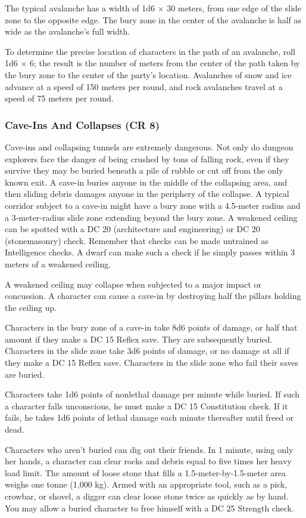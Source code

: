The typical avalanche has a width of 1d6 $\times$ 30 meters, from one edge of the slide zone to the opposite edge. The bury zone in the center of the avalanche is half as wide as the avalanche's full width.

To determine the precise location of characters in the path of an avalanche, roll 1d6 $\times$ 6; the result is the number of meters from the center of the path taken by the bury zone to the center of the party's location. Avalanches of snow and ice advance at a speed of 150 meters per round, and rock avalanches travel at a speed of 75 meters per round.

\subsubsection{Cave-Ins And Collapses (CR 8)}
Cave-ins and collapsing tunnels are extremely dangerous. Not only do dungeon explorers face the danger of being crushed by tons of falling rock, even if they survive they may be buried beneath a pile of rubble or cut off from the only known exit. A cave-in buries anyone in the middle of the collapsing area, and then sliding debris damages anyone in the periphery of the collapse. A typical corridor subject to a cave-in might have a bury zone with a 4.5-meter radius and a 3-meter-radius slide zone extending beyond the bury zone. A weakened ceiling can be spotted with a DC 20  (architecture and engineering) or DC 20  (stonemasonry) check. Remember that  checks can be made untrained as Intelligence checks. A dwarf can make such a check if he simply passes within 3 meters of a weakened ceiling.

A weakened ceiling may collapse when subjected to a major impact or concussion. A character can cause a cave-in by destroying half the pillars holding the ceiling up.

Characters in the bury zone of a cave-in take 8d6 points of damage, or half that amount if they make a DC 15 Reflex save. They are subsequently buried. Characters in the slide zone take 3d6 points of damage, or no damage at all if they make a DC 15 Reflex save. Characters in the slide zone who fail their saves are buried.

Characters take 1d6 points of nonlethal damage per minute while buried. If such a character falls unconscious, he must make a DC 15 Constitution check. If it fails, he takes 1d6 points of lethal damage each minute thereafter until freed or dead.

Characters who aren't buried can dig out their friends. In 1 minute, using only her hands, a character can clear rocks and debris equal to five times her heavy load limit. The amount of loose stone that fills a 1.5-meter-by-1.5-meter area weighs one tonne (1,000 kg). Armed with an appropriate tool, such as a pick, crowbar, or shovel, a digger can clear loose stone twice as quickly as by hand. You may allow a buried character to free himself with a DC 25 Strength check.

